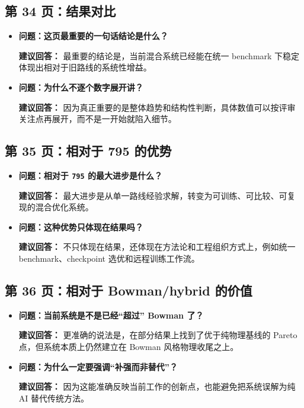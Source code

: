 \documentclass[12pt,a4paper]{ctexart}
\begin{document}
\subsection{第 34 页：结果对比}
\begin{itemize}
\item \textbf{问题：这页最重要的一句话结论是什么？}

\textbf{建议回答：} 最重要的结论是，当前混合系统已经能在统一 benchmark 下稳定体现出相对于旧路线的系统性增益。

\item \textbf{问题：为什么不逐个数字展开讲？}

\textbf{建议回答：} 因为真正重要的是整体趋势和结构性判断，具体数值可以按评审关注点再展开，而不是一开始就陷入细节。
\end{itemize}

\subsection{第 35 页：相对于 795 的优势}
\begin{itemize}
\item \textbf{问题：相对于 \texttt{795} 的最大进步是什么？}

\textbf{建议回答：} 最大进步是从单一路线经验求解，转变为可训练、可比较、可复现的混合优化系统。

\item \textbf{问题：这种优势只体现在结果吗？}

\textbf{建议回答：} 不只体现在结果，还体现在方法论和工程组织方式上，例如统一 benchmark、checkpoint 选优和远程训练工作流。
\end{itemize}

\subsection{第 36 页：相对于 Bowman/hybrid 的价值}
\begin{itemize}
\item \textbf{问题：当前系统是不是已经“超过” Bowman 了？}

\textbf{建议回答：} 更准确的说法是，在部分结果上找到了优于纯物理基线的 Pareto 点，但系统本质上仍然建立在 Bowman 风格物理收尾之上。

\item \textbf{问题：为什么一定要强调“补强而非替代”？}

\textbf{建议回答：} 因为这能准确反映当前工作的创新点，也能避免把系统误解为纯 AI 替代传统方法。
\end{itemize}
\end{document}
